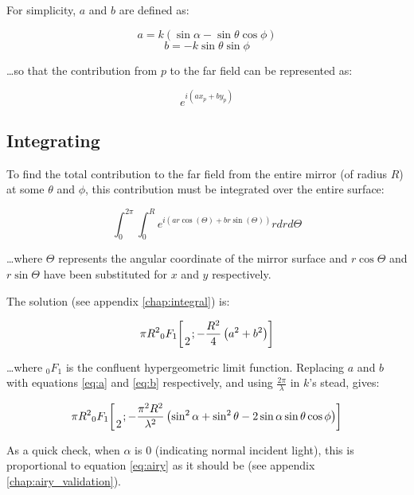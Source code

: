 \documentclass[etd,senior,noacknowledgments]{BYUPhys}
\newcommand*\pFqskip{8mu}
\newcommand*\pFq{\begingroup
        \catcode`\,\active
        \def ,{\mskip\pFqskip\relax}%
        \dopFq
}
\def\dopFq#1#2#3#4#5{%
        {}_{#1}F_{#2}\biggl[\genfrac..{0pt}{}{#3}{#4};#5\biggr]%
        \endgroup
}
\begin{document}
For simplicity, $a$ and $b$ are defined as:

\begin{equation} \label{eq:a}
  a = k\left(\sin{\alpha}-\sin{\theta}\cos{\phi}\right)
\end{equation}
\begin{equation} \label{eq:b}
  b = -k\sin{\theta}\sin{\phi}
\end{equation}

\ldots so that the contribution from $p$ to the far field can be represented as:

\begin{equation}
  e^{i(ax_p+by_p)}
\end{equation}

\subsection{Integrating} \label{sec:integrating}

To find the total contribution to the far field from the entire mirror (of radius $R$) at some $\theta$ and $\phi$, this contribution must be integrated over the entire surface:

\begin{equation}\label{eq:integral1}
  \int_0^{2\pi}\int_0^R e^{i(ar\cos(\Theta)+br\sin(\Theta))} rdrd\Theta
\end{equation}

\ldots where $\Theta$ represents the angular coordinate of the mirror surface and $r\cos\Theta$ and $r\sin\Theta$ have been substituted for $x$ and $y$ respectively.

The solution (see appendix \ref{chap:integral}) is:

\begin{equation}\label{eq:expected_refl}
  \pi R^2 \pFq{0}{1}{}{2}{-\frac{R^2}{4}\left(a^2+b^2\right)}
\end{equation}

\ldots where ${}_0 F_1$ is the confluent hypergeometric limit function. Replacing $a$ and $b$ with equations \ref{eq:a} and \ref{eq:b} respectively, and using $\frac{2\pi}{\lambda}$ in $k$'s stead, gives:

\begin{equation}
  \pi R^2 \pFq{0}{1}{}{2}{-\frac{\pi^2 R^2}{\lambda^2}\left(\sin^2\alpha+\sin^2\theta-2\sin\alpha\sin\theta\cos\phi\right)}
\end{equation}

As a quick check, when $\alpha$ is 0 (indicating normal incident light), this is proportional to equation \ref{eq:airy} as it should be (see appendix \ref{chap:airy_validation}).
\end{document}
